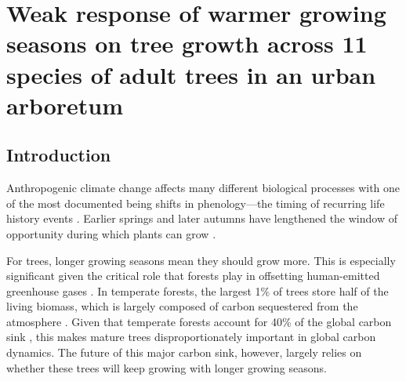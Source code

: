 \chapter{Weak response of warmer growing seasons on tree growth across 11 species of adult trees in an urban arboretum}
\label{ch:CoringTreespotters}



\newcommand{\Arub}{\textit{A. rubrum}}
\newcommand{\Asac}{\textit{A. saccharum}}
\newcommand{\Afla}{\textit{A. flava}}
\newcommand{\Bnig}{\textit{B. nigra}}
\newcommand{\Cgla}{\textit{C. glabra}}
\newcommand{\Cova}{\textit{C. ovata}}
\newcommand{\Pdel}{\textit{P. deltoides}}
\newcommand{\Qalb}{\textit{Q. alba}}
\newcommand{\Qrub}{\textit{Q. rubra}}
\newcommand{\Tame}{\textit{T. americana}}   



\section{Introduction}
Anthropogenic climate change affects many different biological processes with one of the most documented being shifts in phenology---the timing of recurring life history events \citep{cleland_shifting_2007,menzel_european_2006,parmesan_poleward_1999}. Earlier springs and later autumns have lengthened the window of opportunity during which plants can grow \citep{duputie_phenological_2015}. 

For trees, longer growing seasons mean they should grow more. This is especially significant given the critical role that forests play in offsetting human-emitted greenhouse gases \citep{keenan_net_2014, stridbeck_partly_2022,harrisGlobalMapsTwentyfirst2021}. In temperate forests, the largest 1\% of trees store half of the living biomass, which is largely composed of carbon sequestered from the atmosphere \citep{lutz_global_2018,mensah_carbon_2024}. Given that temperate forests account for 40\% of the global carbon sink \citep{gibbs_revised_2025}, this makes mature trees disproportionately important in global carbon dynamics. The future of this major carbon sink, however, largely relies on whether these trees will keep growing with longer growing seasons.

